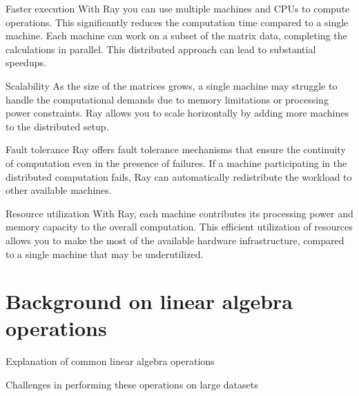 \documentclass{beamer}
\begin{document}
\begin{frame}{Faster execution}
    With Ray you can use multiple machines and CPUs to compute operations. This significantly reduces the computation time compared to a single machine. Each machine can work on a subset of the matrix data, completing the calculations in parallel. This distributed approach can lead to substantial speedups.
\end{frame}

\begin{frame}{Scalability}
    As the size of the matrices grows, a single machine may struggle to handle the computational demands due to memory limitations or processing power constraints. Ray allows you to scale horizontally by adding more machines to the distributed setup.
\end{frame}

\begin{frame}{Fault tolerance}
    Ray offers fault tolerance mechanisms that ensure the continuity of computation even in the presence of failures. If a machine participating in the distributed computation fails, Ray can automatically redistribute the workload to other available machines.
\end{frame}

\begin{frame}{Resource utilization}
    With Ray, each machine contributes its processing power and memory capacity to the overall computation. This efficient utilization of resources allows you to make the most of the available hardware infrastructure, compared to a single machine that may be underutilized.
\end{frame}


\section{Background on linear algebra operations}
\begin{frame}{Explanation of common linear algebra operations}

\end{frame}

\begin{frame}{Challenges in performing these operations on large datasets}

\end{frame}

\begin{frame}{}

\end{frame}
\end{document}
